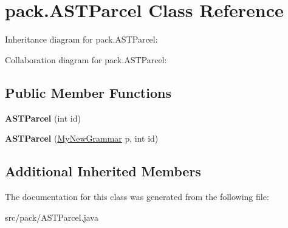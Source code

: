 \hypertarget{classpack_1_1_a_s_t_parcel}{}\section{pack.\+A\+S\+T\+Parcel Class Reference}
\label{classpack_1_1_a_s_t_parcel}


Inheritance diagram for pack.\+A\+S\+T\+Parcel\+:


Collaboration diagram for pack.\+A\+S\+T\+Parcel\+:
\subsection*{Public Member Functions}
\begin{DoxyCompactItemize}
\item 
{\bfseries A\+S\+T\+Parcel} (int id)\hypertarget{classpack_1_1_a_s_t_parcel_a587c512ad4c2a3bad01d22e61c9c9719}{}\label{classpack_1_1_a_s_t_parcel_a587c512ad4c2a3bad01d22e61c9c9719}

\item 
{\bfseries A\+S\+T\+Parcel} (\hyperlink{classpack_1_1_my_new_grammar}{My\+New\+Grammar} p, int id)\hypertarget{classpack_1_1_a_s_t_parcel_a6821011d15267fce2cf706ade24c44d8}{}\label{classpack_1_1_a_s_t_parcel_a6821011d15267fce2cf706ade24c44d8}

\end{DoxyCompactItemize}
\subsection*{Additional Inherited Members}


The documentation for this class was generated from the following file\+:\begin{DoxyCompactItemize}
\item 
src/pack/A\+S\+T\+Parcel.\+java\end{DoxyCompactItemize}
